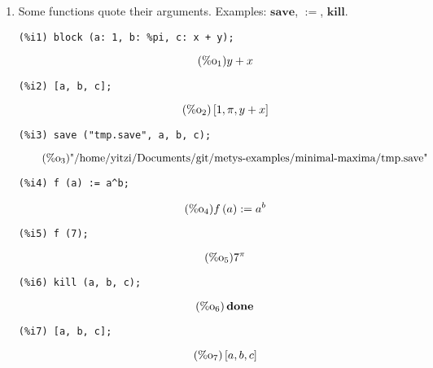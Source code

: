 \documentclass[12pt,leqno]{article}
\begin{document}
\begin{enumerate}
\item Some functions quote their arguments.
Examples: $\mathbf{save}$, $\mathbf{:=}$, $\mathbf{kill}$.
\begin{verbatim}
(%i1) block (a: 1, b: %pi, c: x + y);
\end{verbatim}
\begin{equation}
\tag{$\mathop{\mathrm{\%o}}_{1}$}y+x
\label{eq:doc-group1-code15-1-1}
\end{equation}
\begin{verbatim}
(%i2) [a, b, c];
\end{verbatim}
\begin{equation}
\tag{$\mathop{\mathrm{\%o}}_{2}$}\left[1, \pi, y+x\right]
\label{eq:doc-group1-code15-2-1}
\end{equation}
\begin{verbatim}
(%i3) save ("tmp.save", a, b, c);
\end{verbatim}
\begin{equation}
\tag{$\mathop{\mathrm{\%o}}_{3}$}\mbox{"/home/yitzi/Documents/git/metys-examples/minimal-maxima/tmp.save"}
\label{eq:doc-group1-code15-3-1}
\end{equation}
\begin{verbatim}
(%i4) f (a) := a^b;
\end{verbatim}
\begin{equation}
\tag{$\mathop{\mathrm{\%o}}_{4}$}f\left(a\right) := {a}^{b}
\label{eq:doc-group1-code15-4-1}
\end{equation}
\begin{verbatim}
(%i5) f (7);
\end{verbatim}
\begin{equation}
\tag{$\mathop{\mathrm{\%o}}_{5}$}{7}^{\pi}
\label{eq:doc-group1-code15-5-1}
\end{equation}
\begin{verbatim}
(%i6) kill (a, b, c);
\end{verbatim}
\begin{equation}
\tag{$\mathop{\mathrm{\%o}}_{6}$}\mathop{\mathbf{done}}
\label{eq:doc-group1-code15-6-1}
\end{equation}
\begin{verbatim}
(%i7) [a, b, c];
\end{verbatim}
\begin{equation}
\tag{$\mathop{\mathrm{\%o}}_{7}$}\left[a, b, c\right]
\label{eq:doc-group1-code15-7-1}
\end{equation}



\end{enumerate}
\end{document}
